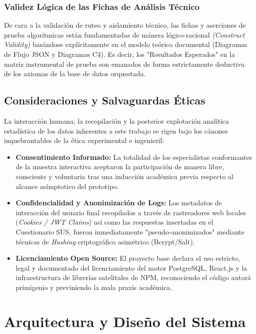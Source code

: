 \documentclass[11pt,a4paper,oneside]{report}
\begin{document}
\subsection{Validez L\'ogica de las Fichas de An\'alisis T\'ecnico}
De cara a la validaci\'on de ruteo y aislamiento t\'ecnico, las fichas y aserciones de prueba algor\'itmicas est\'an fundamentadas de m\'anera l\'ogico-racional \textit{(Construct Validity)} bas\'andose expl\'icitamente en el modelo te\'orico documental (Diagramas de Flujo JSON y Diagramas C4). Es decir, los "Resultados Esperados" en la matriz instrumental de prueba son emanados de forma estrictamente deductiva de los axiomas de la base de datos orquestada.

\section{Consideraciones y Salvaguardas \'Eticas}
La interacci\'on humana, la recopilaci\'on y la posterior explotaci\'on anal\'itica estad\'istica de los datos inherentes a este trabajo se rigen bajo los c\'anones inquebrantables de la \'etica experimental e ingenieril:
\begin{itemize}
    \item \textbf{Consentimiento Informado:} La totalidad de los especialistas conformantes de la muestra interactiva aceptaron la participaci\'on de manera libre, consciente y voluntaria tras una inducci\'on acad\'emica previa respecto al alcance as\'imptotico del prototipo.
    \item \textbf{Confidencialidad y Anonimizaci\'on de Logs:} Los metadatos de interacci\'on del usuario final recopilados a trav\'es de rastreadores web locales (\textit{Cookies / JWT Claims}) as\'i como las respuestas insertadas en el Cuestionario SUS, fueron inmediatamente "pseudo-anonimizados" mediante t\'ecnicas de \textit{Hashing} criptogr\'afico asim\'etrico (Bcrypt/Salt). 
    \item \textbf{Licenciamiento Open Source:} El proyecto base declara el uso estricto, legal y documentado del licenciamiento del motor PostgreSQL, React.js y la infraestructura de librer\'ias satelitales de NPM, reconociendo el c\'odigo autor\'a primigenio y previniendo la mala praxis acad\'emica. 
\end{itemize}


\chapter{Arquitectura y Dise\~no del Sistema}
\end{document}
